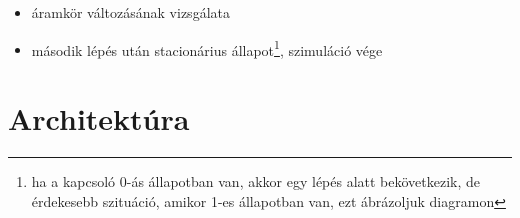 {\begin{itemize}
\begin{itemize}
\begin{itemize}
\item VAGY kapu kiértékelése
\begin{itemize}
\setlength{\itemsep}{0cm}%
\setlength{\parskip}{0cm}%
\item bemenetén lévő értékek lekérése
\item kimenetére kötött érték kiszámolása és kiadása
\end{itemize}
\item csomópont kiértékelése
\begin{itemize}
\setlength{\itemsep}{0cm}%
\setlength{\parskip}{0cm}%
\item bemenetén lévő érték lekérése
\item kimeneteire az érték kiadása
\end{itemize}
\item led kiértékelése (világít/nem világít kijelzése)
\end{itemize}
\item áramkör változásának vizsgálata
\item második lépés után stacionárius állapot\footnote{ha a kapcsoló 0-ás állapotban van, akkor egy lépés alatt bekövetkezik, de érdekesebb szituáció, amikor 1-es állapotban van, ezt ábrázoljuk diagramon}, szimuláció vége
\end{itemize}
\end{itemize}
\vspace{-15pt}}

\section{Architektúra}


